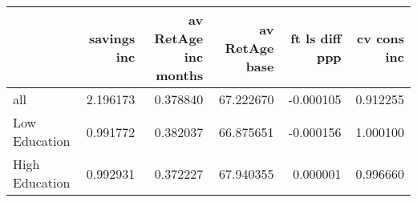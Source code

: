 \begin{tabular}{lrrrrr}
\toprule
 & savings inc & av RetAge inc months & av RetAge base & ft ls diff ppp & cv cons inc \\
\midrule
all & 2.196173 & 0.378840 & 67.222670 & -0.000105 & 0.912255 \\
Low Education & 0.991772 & 0.382037 & 66.875651 & -0.000156 & 1.000100 \\
High Education & 0.992931 & 0.372227 & 67.940355 & 0.000001 & 0.996660 \\
\bottomrule
\end{tabular}
